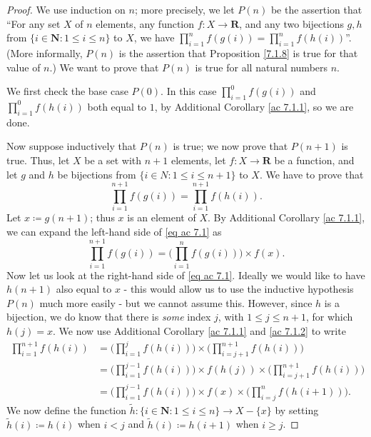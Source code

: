 \begin{proof}
We use induction on \(n\);
more precisely, we let \(P(n)\) be the assertion that ``For any set \(X\) of \(n\) elements, any function \(f : X \to \mathbf{R}\), and any two bijections \(g, h\) from \(\{i \in \mathbf{N} : 1 \leq i \leq n\}\) to \(X\), we have \(\prod_{i = 1}^n f(g(i)) = \prod_{i = 1}^n f(h(i))\)''.
(More informally, \(P(n)\) is the assertion that Proposition \ref{7.1.8} is true for that value of \(n\).)
We want to prove that \(P(n)\) is true for all natural numbers \(n\).

We first check the base case \(P(0)\).
In this case \(\prod_{i = 1}^0 f(g(i))\) and \(\prod_{i = 1}^0 f(h(i))\) both equal to \(1\), by Additional Corollary \ref{ac 7.1.1}, so we are done.

Now suppose inductively that \(P(n)\) is true;
we now prove that \(P(n + 1)\) is true.
Thus, let \(X\) be a set with \(n + 1\) elements, let \(f : X \to \mathbf{R}\) be a function, and let \(g\) and \(h\) be bijections from \(\{i \in N : 1 \leq i \leq n + 1\}\) to \(X\).
We have to prove that
\[
    \prod_{i = 1}^{n + 1} f(g(i)) = \prod_{i = 1}^{n + 1} f(h(i)). \tag{ac 7.1}\label{eq ac 7.1}
\]
Let \(x \coloneqq g(n + 1)\);
thus \(x\) is an element of \(X\).
By Additional Corollary \ref{ac 7.1.1}, we can expand the left-hand side of \eqref{eq ac 7.1} as
\[
    \prod_{i = 1}^{n + 1} f(g(i)) = \Bigg(\prod_{i = 1}^n f(g(i))\Bigg) \times f(x).
\]
Now let us look at the right-hand side of \eqref{eq ac 7.1}.
Ideally we would like to have \(h(n + 1)\) also equal to \(x\)
- this would allow us to use the inductive hypothesis \(P(n)\) much more easily
- but we cannot assume this.
However, since \(h\) is a bijection, we do know that there is \emph{some} index \(j\), with \(1 \leq j \leq n + 1\), for which \(h(j) = x\).
We now use Additional Corollary \ref{ac 7.1.1} and \ref{ac 7.1.2} to write
\begin{align*}
\prod_{i = 1}^{n + 1} f(h(i)) &= \Bigg(\prod_{i = 1}^j f(h(i))\Bigg) \times \Bigg(\prod_{i = j + 1}^{n + 1} f(h(i))\Bigg) \\
&= \Bigg(\prod_{i = 1}^{j - 1} f(h(i))\Bigg) \times f(h(j)) \times \Bigg(\prod_{i = j + 1}^{n + 1} f(h(i))\Bigg) \\
&= \Bigg(\prod_{i = 1}^{j - 1} f(h(i))\Bigg) \times f(x) \times \Bigg(\prod_{i = j}^n f(h(i + 1))\Bigg).
\end{align*}
We now define the function \(\tilde{h} : \{i \in \mathbf{N} : 1 \leq i \leq n\} \to X - \{x\}\) by setting \(\tilde{h}(i) \coloneqq h(i)\) when \(i < j\) and \(\tilde{h}(i) \coloneqq h(i + 1)\) when \(i \geq j\).

\end{proof}

